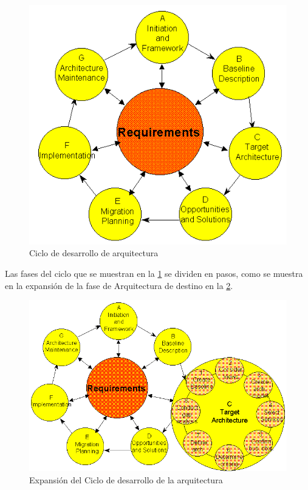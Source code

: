 \begin{figure}[h!]
	\centering
	\includegraphics[width=1\linewidth]{ARQUITECTURA/imgs/cycle}
	\caption{Ciclo de desarrollo de arquitectura}
	\label{cycle}
\end{figure}

\newpage
Las fases del ciclo que se muestran en la \ref{cycle} se dividen en pasos, como se muestra en la expansión de la fase de Arquitectura de destino en la \ref{expan}.

\begin{figure}[h!]
	\centering
	\includegraphics[width=1\linewidth]{ARQUITECTURA/imgs/expan}
	\caption{Expansión del Ciclo de desarrollo de la arquitectura}
	\label{expan}
\end{figure}

